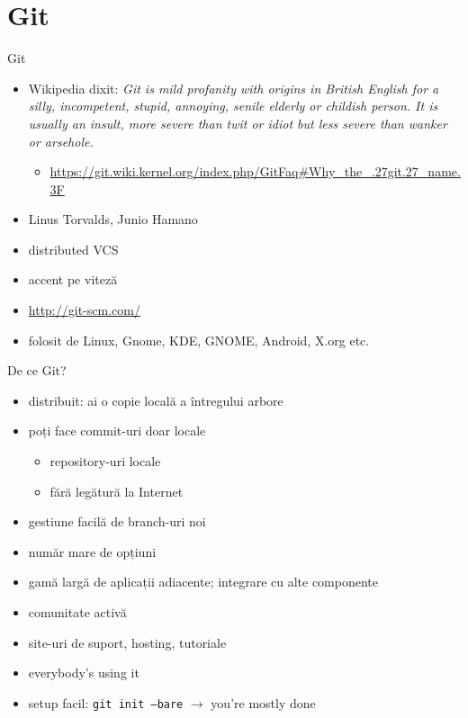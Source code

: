 \documentclass{beamer}
\begin{document}
\section{Git}

\begin{frame}{Git}
  \begin{itemize}
    \item Wikipedia dixit: \textit{Git is mild profanity with origins in
    British English for a silly, incompetent, stupid, annoying, senile elderly
    or childish person. It is usually an insult, more severe than twit or
    idiot but less severe than wanker or arsehole.}
      \begin{itemize}
        \item
        \url{https://git.wiki.kernel.org/index.php/GitFaq\#Why_the_.27git.27_name.3F}
      \end{itemize}
    \item Linus Torvalds, Junio Hamano
    \item distributed VCS
    \item accent pe viteză
    \item \url{http://git-scm.com/}
    \item folosit de Linux, Gnome, KDE, GNOME, Android, X.org etc.
  \end{itemize}
\end{frame}

\begin{frame}{De ce Git?}
  \begin{itemize}
    \item distribuit: ai o copie locală a întregului arbore
    \item poți face commit-uri doar locale
      \begin{itemize}
        \item repository-uri locale
        \item fără legătură la Internet
      \end{itemize}
    \item gestiune facilă de branch-uri noi
    \item număr mare de opțiuni
    \item gamă largă de aplicații adiacente; integrare cu alte componente
    \item comunitate activă
    \item site-uri de suport, hosting, tutoriale
    \item everybody's using it
    \item setup facil: \texttt{git init --bare} $\rightarrow$ you're mostly done
  \end{itemize}
\end{frame}
\end{document}
